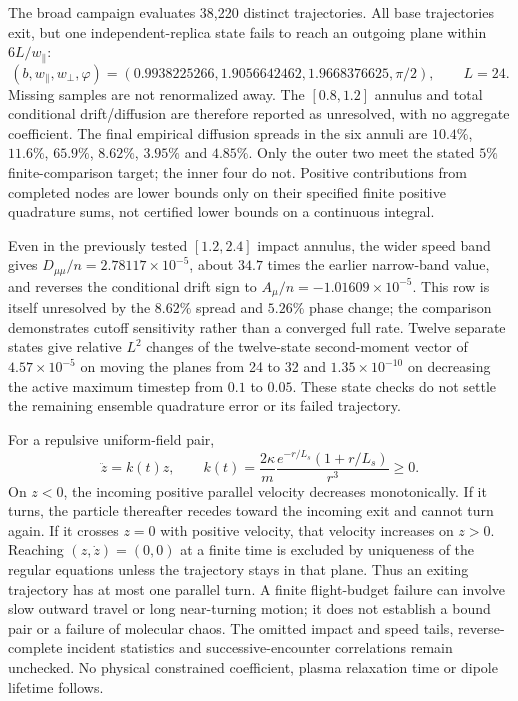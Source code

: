 \documentclass[11pt,letterpaper]{article}
\begin{document}
The broad campaign evaluates 38,220 distinct trajectories. All base
trajectories exit, but one independent-replica state fails to reach an
outgoing plane within $6L/w_\parallel$:
\begin{equation}
 (b,w_\parallel,w_\perp,\varphi)
 =(0.9938225266,1.9056642462,1.9668376625,\pi/2),\qquad L=24.
\end{equation}
Missing samples are not renormalized away. The $[0.8,1.2]$ annulus and total
conditional drift/diffusion are therefore reported as unresolved, with no
aggregate coefficient. The final empirical diffusion spreads in the six
annuli are $10.4\%$, $11.6\%$, $65.9\%$, $8.62\%$, $3.95\%$ and $4.85\%$.
Only the outer two meet the stated $5\%$ finite-comparison target; the inner
four do not. Positive contributions from completed nodes are lower bounds
only on their specified finite positive quadrature sums, not certified lower
bounds on a continuous integral.

Even in the previously tested $[1.2,2.4]$ impact annulus, the wider speed band
gives $D_{\mu\mu}/n=2.78117\times10^{-5}$, about $34.7$ times the earlier
narrow-band value, and reverses the conditional drift sign to
$A_\mu/n=-1.01609\times10^{-5}$. This row is itself unresolved by the
$8.62\%$ spread and $5.26\%$ phase change; the comparison demonstrates
cutoff sensitivity rather than a converged full rate. Twelve separate
states give relative $L^2$ changes of the twelve-state second-moment vector
of $4.57\times10^{-5}$ on moving the planes from 24 to 32 and
$1.35\times10^{-10}$ on decreasing the active maximum timestep from
$0.1$ to $0.05$. These state checks do not settle the
remaining ensemble quadrature error or its failed trajectory.

For a repulsive uniform-field pair,
\begin{equation}
 \ddot z=k(t)z,\qquad
 k(t)=\frac{2\kappa}{m}\frac{e^{-r/L_s}(1+r/L_s)}{r^3}\ge0.
 \label{eq:encounterparallelturn}
\end{equation}
On $z<0$, the incoming positive parallel velocity decreases monotonically.
If it turns, the particle thereafter recedes toward the incoming exit and
cannot turn again. If it crosses $z=0$ with positive velocity, that velocity
increases on $z>0$. Reaching $(z,\dot z)=(0,0)$ at a finite time is excluded
by uniqueness of the regular equations unless the trajectory stays in that
plane. Thus an exiting trajectory has at most one parallel turn. A finite
flight-budget failure can involve slow outward travel or long near-turning
motion; it does not establish a bound pair or a failure of molecular chaos.
The omitted impact and speed tails, reverse-complete incident statistics
and successive-encounter correlations remain unchecked. No physical constrained
coefficient, plasma relaxation time or dipole lifetime follows.
\end{document}
